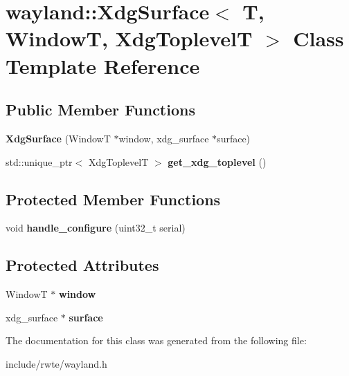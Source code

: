 \hypertarget{classwayland_1_1XdgSurface}{}\section{wayland\+::Xdg\+Surface$<$ T, WindowT, Xdg\+ToplevelT $>$ Class Template Reference}
\label{classwayland_1_1XdgSurface}
\subsection*{Public Member Functions}
\begin{DoxyCompactItemize}
\item 
\mbox{\label{classwayland_1_1XdgSurface_a3449e437293d27a9ae31f4c1abf816b4}} 
{\bfseries Xdg\+Surface} (WindowT $\ast$window, xdg\+\_\+surface $\ast$surface)
\item 
\mbox{\label{classwayland_1_1XdgSurface_a430a20be879ab8abf71012d36088579f}} 
std\+::unique\+\_\+ptr$<$ Xdg\+ToplevelT $>$ {\bfseries get\+\_\+xdg\+\_\+toplevel} ()
\end{DoxyCompactItemize}
\subsection*{Protected Member Functions}
\begin{DoxyCompactItemize}
\item 
\mbox{\label{classwayland_1_1XdgSurface_a89ef03b9274eedf40671556c38310254}} 
void {\bfseries handle\+\_\+configure} (uint32\+\_\+t serial)
\end{DoxyCompactItemize}
\subsection*{Protected Attributes}
\begin{DoxyCompactItemize}
\item 
\mbox{\label{classwayland_1_1XdgSurface_a72ab34a28e1b4f87f99a65eee20ab398}} 
WindowT $\ast$ {\bfseries window}
\item 
\mbox{\label{classwayland_1_1XdgSurface_ae26d69ff146209f83afc57318779abb8}} 
xdg\+\_\+surface $\ast$ {\bfseries surface}
\end{DoxyCompactItemize}


The documentation for this class was generated from the following file\+:\begin{DoxyCompactItemize}
\item 
include/rwte/wayland.\+h\end{DoxyCompactItemize}

